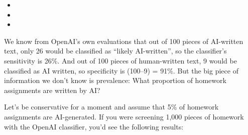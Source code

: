 \documentclass[
  letterpaper,
  DIV=11,
  numbers=noendperiod,
  oneside]{scrartcl}
\providecommand{\tightlist}{%
  \setlength{\itemsep}{0pt}\setlength{\parskip}{0pt}}\usepackage{longtable,booktabs,array}
\begin{document}
\begin{itemize}
\item
\item
\item
\end{itemize}

We know from OpenAI's own evaluations that out of 100 pieces of
AI-written text, only 26 would be classified as ``likely AI-written'',
so the classifier's sensitivity is 26\%. And out of 100 pieces of
human-written text, 9 would be classified as AI written, so specificity
is (100--9) = 91\%. But the big piece of information we don't know is
prevalence: What proportion of homework assignments are written by AI?

Let's be conservative for a moment and assume that 5\% of homework
assignments are AI-generated. If you were screening 1,000 pieces of
homework with the OpenAI classifier, you'd see the following results:
\end{document}
